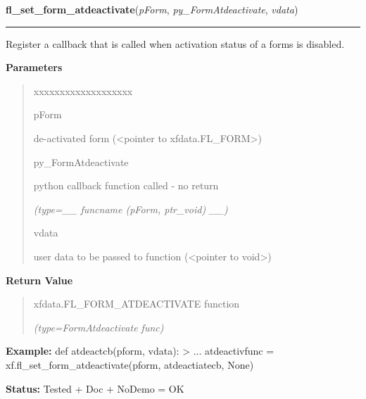     \label{xformslib:library:fl_set_form_atdeactivate}

    \vspace{0.5ex}

\hspace{.8\funcindent}\begin{boxedminipage}{\funcwidth}

    \raggedright \textbf{fl\_set\_form\_atdeactivate}(\textit{pForm}, \textit{py\_FormAtdeactivate}, \textit{vdata})

    \vspace{-1.5ex}

    \rule{\textwidth}{0.5\fboxrule}
\setlength{\parskip}{2ex}
    Register a callback that is called when activation status of a forms is
    disabled.

\setlength{\parskip}{1ex}
      \textbf{Parameters}
      \vspace{-1ex}

      \begin{quote}
        \begin{Ventry}{xxxxxxxxxxxxxxxxxxx}

          \item[pForm]

          de-activated form ({\textless}pointer to 
          xfdata.FL\_FORM{\textgreater})

          \item[py\_FormAtdeactivate]

          python callback function called - no return

            {\it (type=\_\_ funcname (pForm, ptr\_void) \_\_)}

          \item[vdata]

          user data to be passed to function ({\textless}pointer to 
          void{\textgreater})

        \end{Ventry}

      \end{quote}

      \textbf{Return Value}
    \vspace{-1ex}

      \begin{quote}
      xfdata.FL\_FORM\_ATDEACTIVATE function

      {\it (type=FormAtdeactivate func)}

      \end{quote}

\textbf{Example:} def atdeactcb(pform, vdata): {\textgreater} ... atdeactivfunc = 
xf.fl\_set\_form\_atdeactivate(pform, atdeactiatecb, None)



\textbf{Status:} Tested + Doc + NoDemo = OK



    \end{boxedminipage}

